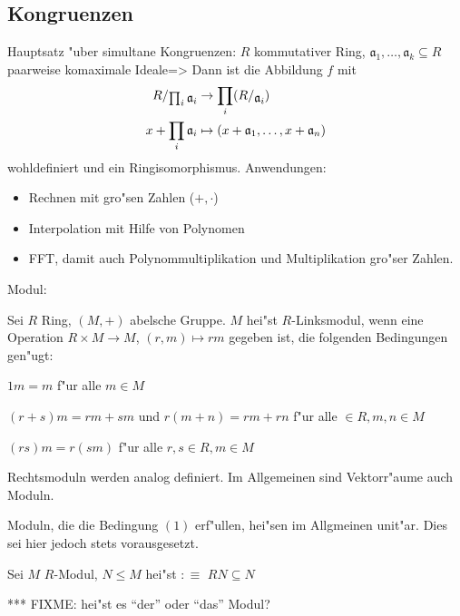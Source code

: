 \subsection{Kongruenzen}
\theorem Hauptsatz "uber simultane Kongruenzen:
  $R$ kommutativer Ring, $\mathfrak a_1,\ldots,\mathfrak a_k\subseteq R$ 
  paarweise komaximale Ideale=>{
%
%
%
%
  Dann ist die Abbildung $f$ mit
  \begin{align*}
    \rcoset R {\prod_i \mathfrak a_i}&\to \prod_i (\rcoset R {\mathfrak a_i}) \\
    x+\prod_i \mathfrak a_i &\mapsto (x+\mathfrak a_1,\ldots,x+\mathfrak a_n) 
    \end{align*}
  wohldefiniert und ein Ringisomorphismus.
  }
\remark Anwendungen:{
  \begin{itemize}
    \item Rechnen mit gro"sen Zahlen ($+,\cdot$)
    \item Interpolation mit Hilfe von Polynomen
    \item FFT, damit auch Polynommultiplikation und Multiplikation gro"ser 
      Zahlen.
    \end{itemize}
  }
 Modul:{
  Sei $R$ Ring, $(M,+)$ abelsche Gruppe. $M$ hei"st $R$-Linksmodul, wenn
  eine Operation $R\times M \to M$, $(r,m)\mapsto rm$ gegeben ist, die 
  folgenden Bedingungen gen"ugt:
  \begin{stmts}
    \item $1m=m$ f"ur alle $m\in M$
    \item $(r+s)m=rm+sm$ und $r(m+n)=rm+rn$ f"ur alle $\in R,m,n\in M$
    \item $(rs)m=r(sm)$ f"ur alle $r,s\in R,m\in M$
    \end{stmts}  
  Rechtsmoduln werden analog definiert. Im Allgemeinen sind Vektorr"aume
  auch Moduln.
  
  Moduln, die die Bedingung $(1)$ erf"ullen, hei"sen im Allgmeinen 
  unit"ar. Dies sei hier jedoch stets vorausgesetzt. 
  
  Sei $M$ $R$-Modul, $N\le M$ hei"st  
  $:\equiv$ $RN\subseteq N$

  *** FIXME: hei"st es ``der'' oder ``das'' Modul?
  }
